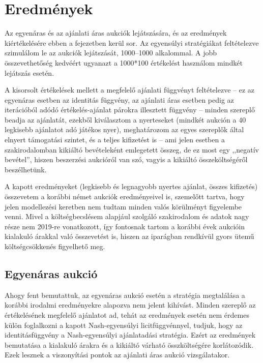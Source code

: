 \documentclass[twoside, magyar, showtrims]{corvinusphd}
\begin{document}
\chapter{Eredmények}\label{results}

\scwords Az egyenáras és az ajánlati áras
aukciók lejátszására, és az
eredmények kiértékelésére ebben a fejezetben
kerül sor. Az egyensúlyi stratégiákat
feltételezve szimulálom le az aukciók lejátszását,
1000--1000 alkalommal. A jobb összevethetőség kedvéért
ugyanazt a 1000*100 értékelést használom
mindkét lejátszás esetén. 

A kisorsolt értékelések mellett a megfelelő ajánlati
függvényt feltételezve -- ez az egyenáras esetben
az identitás függvény, az ajánlati áras esetben
pedig az iterációból adódó értékelés-ajánlat
párokra illesztett függvény --
minden szereplő beadja az ajánlatát,
ezekből kiválasztom a nyerteseket (mindkét aukción
a 40 legkisebb ajánlatot adó játékos nyer), meghatározom
az egyes szereplők által elnyert támogatási szintet,
és a teljes kifizetést is -- ami jelen esetben a szakirodalomban
kikiáltó bevételeként emlegetett összeg, de ez most egy
,,negatív bevétel'', hiszen beszerzési aukcióról van szó,
vagyis a kikiáltó összeköltségéről beszélhetünk.

A kapott eredményeket (legkisebb és legnagyobb nyertes ajánlat,
összes kifizetés) összevetem a korábbi német aukciók
eredményeivel is, szemelőtt tartva, hogy jelen modellezési
keretben nem tudtam minden valós körülményt figyelembe venni.
Mivel a költségbecslésem alapjául szolgáló szakirodalom
és adatok nagy része nem 2019-re vonatkozott, így 
fontosnak tartom a korábbi évek aukcióin kialakuló 
árakkal való összevetést is, hiszen az iparágban
rendkívül gyors ütemű költségcsökkenés figyelhető meg.

\section{Egyenáras aukció}

Ahogy fent bemutattuk, az egyenáras aukció esetén a stratégia megtalálása
a korábbi irodalmi eredményekre alapozva nem jelent kihívást.
Minden szereplő az értékelésének megfelelő ajánlatot ad, 
tehát az eredmények esetén nem érdemes külön foglalkozni
a kapott Nash-egyensúlyi licitfüggvénnyel, tudjuk, hogy
az identitásfüggvény a Nash-egyensúlyi ajánlatadási stratégia.
Ezért az eredmények bemutatása a kialakuló árakra 
és a kikiáltó várható összköltségére korlátozódik.
Ezek lesznek a viszonyítási pontok az ajánlati áras aukció vizsgálatakor.
\end{document}
